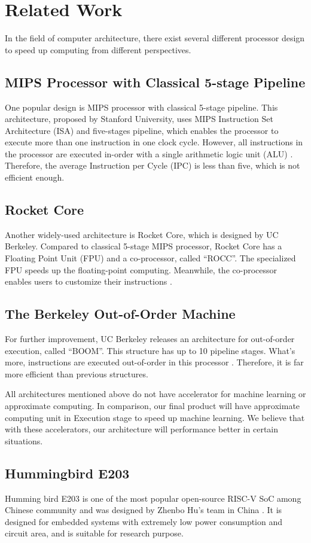 
\let\clearpage\relax
\chapter{Related Work}

In the field of computer architecture, there exist several different processor design to speed up computing from different perspectives.

\section{MIPS Processor with Classical 5-stage Pipeline}
One popular design is MIPS processor with classical 5-stage pipeline. This architecture, proposed by Stanford University, uses MIPS Instruction Set Architecture (ISA) and five-stages pipeline, which enables the processor to execute more than one instruction in one clock cycle. However, all instructions in the processor are executed in-order with a single arithmetic logic unit (ALU) \cite{MIPS_V_Stage}. Therefore, the average Instruction per Cycle (IPC) is less than five, which is not efficient enough.

\section{Rocket Core}
Another widely-used architecture is Rocket Core, which is designed by UC Berkeley. Compared to classical 5-stage MIPS processor, Rocket Core has a Floating Point Unit (FPU) and a co-processor, called ``ROCC''. The specialized FPU speeds up the floating-point computing. Meanwhile, the co-processor enables users to customize their instructions \cite{Rocket_Core}.

\section{The Berkeley Out-of-Order Machine}\label{section: BOOM}
For further improvement, UC Berkeley releases an architecture for out-of-order execution, called ``BOOM''. This structure has up to 10 pipeline stages. What's more, instructions are executed out-of-order in this processor \cite{Boom}. Therefore, it is far more efficient than previous structures.

All architectures mentioned above do not have accelerator for machine learning or approximate computing. In comparison, our final product will have approximate computing unit in Execution stage to speed up machine learning. We believe that with these accelerators, our architecture will performance better in certain situations.

\section{Hummingbird E203}
Humming bird E203 is one of the most popular open-source RISC-V SoC among Chinese community and was designed by Zhenbo Hu's team in China \cite{E203}. It is designed for embedded systems with extremely low power consumption and circuit area, and is suitable for research purpose.

